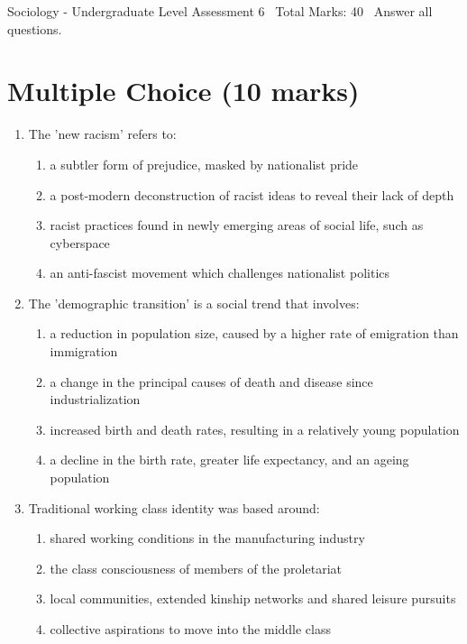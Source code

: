 \documentclass[12pt]{article}
\begin{document}
\begin{center}
Sociology - Undergraduate Level Assessment 6 \
Total Marks: 40 \
Answer all questions.
\end{center}

\section*{Multiple Choice (10 marks)}
\begin{enumerate}[label=\arabic*.]
\item The 'new racism' refers to:
\begin{enumerate}[label=(\alph*)]
    \item a subtler form of prejudice, masked by nationalist pride
    \item a post-modern deconstruction of racist ideas to reveal their lack of depth
    \item racist practices found in newly emerging areas of social life, such as cyberspace
    \item an anti-fascist movement which challenges nationalist politics
\end{enumerate}
\item The 'demographic transition' is a social trend that involves:
\begin{enumerate}[label=(\alph*)]
    \item a reduction in population size, caused by a higher rate of emigration than immigration
    \item a change in the principal causes of death and disease since industrialization
    \item increased birth and death rates, resulting in a relatively young population
    \item a decline in the birth rate, greater life expectancy, and an ageing population
\end{enumerate}
\item Traditional working class identity was based around:
\begin{enumerate}[label=(\alph*)]
    \item shared working conditions in the manufacturing industry
    \item the class consciousness of members of the proletariat
    \item local communities, extended kinship networks and shared leisure pursuits
    \item collective aspirations to move into the middle class
\end{enumerate}

\end{enumerate}
\end{document}
